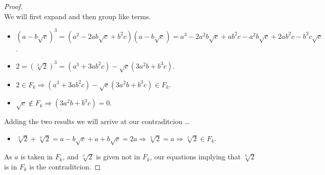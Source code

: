 \documentclass[12pt]{article}
\newcommand{\ds}{\displaystyle}
\theoremstyle{plain}
\begin{document}
\begin{proof}
  \ \\

  We will first expand and then group like terms.

  \begin{itemize}
    \item $ \ds (a - b\sqrt{c})^{3} = (a^{2} - 2ab\sqrt{c} + b^{2}c)(a - b\sqrt{c}) = a^{3} - 2a^{2}b\sqrt{c} + ab^{2}c - a^{2}b\sqrt{c} + 2ab^{2}c - b^{3}c\sqrt{c} $.
    \item $ \ds 2 = (\sqrt[3]{2})^{3} = (a^{3} + 3ab^{2}c) - \sqrt{c}(3a^{2}b + b^{3}c) $.
    \item $ \ds 2 \in F_{k} \Rightarrow (a^{3} + 3ab^{2}c) - \sqrt{c}(3a^{2}b + b^{3}c) \in F_{k} $.
    \item $ \ds \sqrt{c} \notin F_{k} \Rightarrow (3a^{2}b + b^{3}c) = 0 $.
  \end{itemize}

  Adding the two results we will arrive at our contraditcion \dots

  \begin{itemize}
    \item $ \ds \sqrt[3]{2} + \sqrt[3]{2} = a - b\sqrt{c} + a + b\sqrt{c} = 2a \Rightarrow \sqrt[3]{2} = a \Rightarrow \sqrt[3]{2} \in F_{k} $.
  \end{itemize}

  As $ a $ is taken in $ F_{k} $, and $ \sqrt[3]{2} $ is given not in $ F_{k} $, our equations implying that $ \sqrt[3]{2} $ is in $ F_{k} $ is the contraditcion.

\end{proof}
\end{document}

